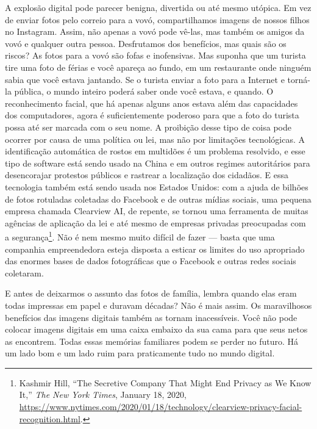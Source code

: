 A explosão digital pode parecer benigna, divertida ou até mesmo utópica. Em vez 
de enviar fotos pelo correio para a vovó, compartilhamos imagens de nossos 
filhos no Instagram. Assim, não apenas a vovó pode vê-las, mas também os amigos 
da vovó e qualquer outra pessoa. Desfrutamos dos benefícios, mas quais são os 
riscos? As fotos para a vovó são fofas e inofensivas. Mas suponha que um turista
tire uma foto de férias e você apareça ao fundo, em um restaurante onde ninguém
sabia que você estava jantando. Se o turista enviar a foto para a Internet e
torná-la pública, o mundo inteiro poderá saber onde você estava, e quando. O
reconhecimento facial, que há apenas alguns anos estava além das capacidades dos
computadores, agora é suficientemente poderoso para que a foto do turista possa
até ser marcada com o seu nome. A proibição desse tipo de coisa pode ocorrer por
causa de uma política ou lei, mas não por limitações tecnológicas. A
identificação automática de rostos em multidões é um problema resolvido, e esse
tipo de software está sendo usado na China e em outros regimes autoritários para
desencorajar protestos públicos e rastrear a localização dos cidadãos. E essa
tecnologia também está sendo usada nos Estados Unidos: com a ajuda de bilhões de
fotos rotuladas coletadas do Facebook e de outras mídias sociais, uma pequena
empresa chamada Clearview AI, de repente, se tornou uma ferramenta de muitas
agências de aplicação da lei e até mesmo de empresas privadas preocupadas
com a segurança\footnote{Kashmir Hill, ``The Secretive Company That Might End
Privacy as We Know It,'' \textit{The New York Times}, January 18, 2020,
\url{https://www.nytimes.com/2020/01/18/technology/clearview-privacy-facial-recognition.html}.}.
Não é nem mesmo muito difícil de fazer --- basta que uma companhia
empreendedora esteja disposta a esticar os limites do uso apropriado das enormes
bases de dados fotográficas que o Facebook e outras redes sociais coletaram.

E antes de deixarmos o assunto das fotos de família, lembra quando elas eram 
todas impressas em papel e duravam décadas? Não é mais assim. Os maravilhosos 
benefícios das imagens digitais também as tornam inacessíveis. Você não pode 
colocar imagens digitais em uma caixa embaixo da sua cama para que seus netos as
encontrem. Todas essas memórias familiares podem se perder no futuro. Há um lado
bom e um lado ruim para praticamente tudo no mundo digital.

